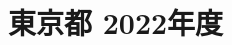 \documentclass[../../hsm_tok_q.tex]{subfiles}
\begin{document}
    \section{東京都 2022年度}
    \subsection{　}
    
    \newpage
    \subsection{　}
    
    \newpage
    \subsection{　}
    
    \newpage
    \subsection{　}
    
    \newpage
    \subsection{　}
    
\end{document}
